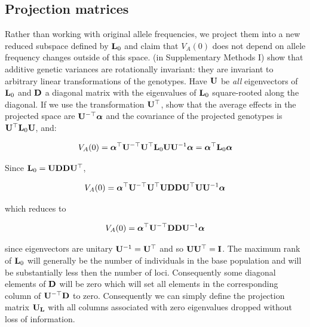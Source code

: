 \documentclass[12pt]{article}
\begin{document}
\begin{bibunit}
\section{Projection matrices}
\label{App:projection}

Rather than working with original allele frequencies, we project them into a new reduced subspace defined by ${\bf L}_0$ and claim that $V_A(0)$ does not depend on allele frequency changes outside of this space.  \citet{de2015genomic} (in Supplementary Methods I) show that additive genetic variances are rotationally invariant: they are invariant to arbitrary linear transformations of the genotypes. Have ${\bf U}$ be \emph{all} eigenvectors of ${\bf L}_0$ and ${\bf D}$ a diagonal matrix with the eigenvalues of ${\bf L}_0$ square-rooted along the diagonal.  If we use the transformation ${\bf U}^{\top}$, \citet{de2015genomic} show that the average effects in the projected space are ${\bf U}^{-\top}\boldsymbol{\alpha}$ and the covariance of the projected genotypes is ${\bf U}^{\top}{\bf L}_0{\bf U}$, and:

\begin{equation}
V_A(0)=\boldsymbol{\alpha}^{\top}{\bf U}^{-\top}{\bf U}^{\top}{\bf L}_0{\bf U}{\bf U}^{-1}\boldsymbol{\alpha}=\boldsymbol{\alpha}^{\top}{\bf L}_0\boldsymbol{\alpha}
\end{equation}

Since ${\bf L}_0={\bf U}{\bf D}{\bf D}{\bf U}^{\top}$, 

\begin{equation}
V_A(0)=\boldsymbol{\alpha}^{\top}{\bf U}^{-\top}{\bf U}^{\top}{\bf U}{\bf D}{\bf D}{\bf U}^{\top}{\bf U}{\bf U}^{-1}\boldsymbol{\alpha}
\end{equation}

which reduces to 

\begin{equation}
V_A(0)=\boldsymbol{\alpha}^{\top}{\bf U}^{-\top}{\bf D}{\bf D}{\bf U}^{-1}\boldsymbol{\alpha}
\end{equation}

since eigenvectors are unitary ${\bf U}^{-1}={\bf U}^{\top}$ and so ${\bf U}{\bf U}^{\top}={\bf I}$. The maximum rank of ${\bf L}_0$ will generally be the number of individuals in the base population and will be substantially less then the number of loci. Consequently some diagonal elements of ${\bf D}$ will be zero which will set all elements in the corresponding column of ${\bf U}^{-\top}{\bf D}$ to zero. Consequently we can simply define the projection matrix ${\bf U}_{\bf L}$ with all columns associated with zero eigenvalues dropped without loss of information. 


\end{bibunit}
\end{document}
